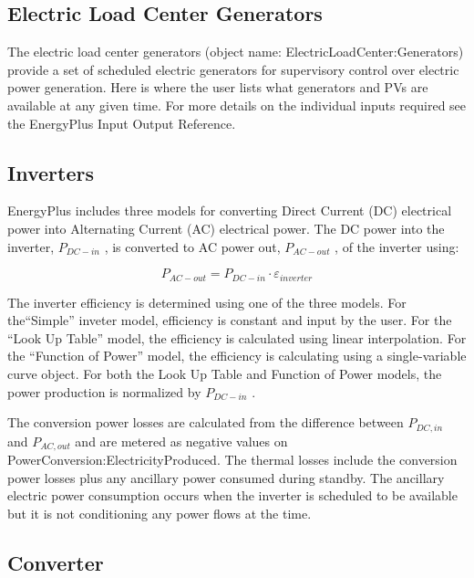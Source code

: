 \subsection{Electric Load Center Generators}\label{electric-load-center-generators}

The electric load center generators (object name: ElectricLoadCenter:Generators) provide a set of scheduled electric generators for supervisory control over electric power generation. Here is where the user lists what generators and PVs are available at any given time. For more details on the individual inputs required see the EnergyPlus Input Output Reference.

\subsection{Inverters}\label{inverters}

EnergyPlus includes three models for converting Direct Current (DC) electrical power into Alternating Current (AC) electrical power. The DC power into the inverter, \({P_{DC - in}}\) , is converted to AC power out, \({P_{AC - out}}\) , of the inverter using:

\begin{equation}
{P_{AC - out}} = {P_{DC - in}} \cdot {\varepsilon_{inverter}}
\end{equation}

The inverter efficiency is determined using one of the three models. For the``Simple'' inveter model, efficiency is constant and input by the user. For the ``Look Up Table'' model, the efficiency is calculated using linear interpolation. For the ``Function of Power'' model, the efficiency is calculating using a single-variable curve object. For both the Look Up Table and Function of Power models, the power production is normalized by \({P_{DC - in}}\) .

The conversion power losses are calculated from the difference between $ {P_{DC,in}} $ and $ {P_{AC,out}} $ and are metered as negative values on PowerConversion:ElectricityProduced.  The thermal losses include the conversion power losses plus any ancillary power consumed during standby.  The ancillary electric power consumption occurs when the inverter is scheduled to be available but it is not conditioning any power flows at the time. 

\subsection{Converter}

